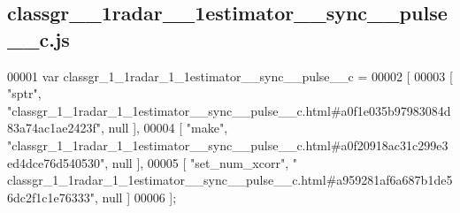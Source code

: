 \subsection{classgr\+\_\+\_\+1radar\+\_\+\_\+1estimator\+\_\+\+\_\+sync\+\_\+\+\_\+pulse\+\_\+\+\_\+c.\+js}
\label{classgr__1__1radar__1__1estimator____sync____pulse____c_8js_source}

\begin{DoxyCode}
00001 var classgr_1_1radar_1_1estimator__sync__pulse__c =
00002 [
00003     [ \textcolor{stringliteral}{"sptr"}, \textcolor{stringliteral}{"classgr\_1\_1radar\_1\_1estimator\_\_sync\_\_pulse\_\_c.html#a0f1e035b97983084d83a74ac1ae2423f"}, null 
      ],
00004     [ \textcolor{stringliteral}{"make"}, \textcolor{stringliteral}{"classgr\_1\_1radar\_1\_1estimator\_\_sync\_\_pulse\_\_c.html#a0f20918ac31c299e3ed4dce76d540530"}, null 
      ],
00005     [ \textcolor{stringliteral}{"set\_num\_xcorr"}, \textcolor{stringliteral}{"
      classgr\_1\_1radar\_1\_1estimator\_\_sync\_\_pulse\_\_c.html#a959281af6a687b1de56dc2f1c1e76333"}, null ]
00006 ];
\end{DoxyCode}
